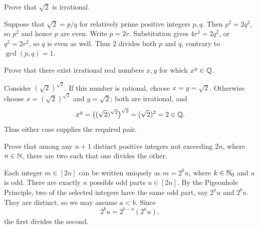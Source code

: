 \documentclass[11pt, oneside]{article}
\begin{document}


\begin{problem}
Prove that $\sqrt{2}$ is irrational.
\end{problem}
\begin{solution}
Suppose that $\sqrt{2}=p/q$ for relatively prime positive integers $p, q$.
Then $p^2=2q^2$, so $p^2$ and hence $p$ are even. Write $p=2r$.
Substitution gives $4r^2=2q^2$, or $q^2=2r^2$, so $q$ is even as well.
Thus $2$ divides both $p$ and $q$, contrary to $\gcd(p, q)=1$.
\end{solution}

\begin{problem}
Prove that there exist irrational real numbers $x, y$ for which $x^y\in\mathbb{Q}$.
\end{problem}
\begin{solution}
Consider $(\sqrt{2})^{\sqrt{2}}$. If this number is rational, choose
$x=y=\sqrt{2}$. Otherwise choose
$x=(\sqrt{2})^{\sqrt{2}}$ and $y=\sqrt{2}$; both are irrational, and
\[
x^y=\bigl((\sqrt{2})^{\sqrt{2}}\bigr)^{\sqrt{2}}
=(\sqrt{2})^2=2\in\mathbb{Q}.
\]
Thus either case supplies the required pair.
\end{solution}

\begin{problem}
Prove that among any $n+1$ distinct positive integers not exceeding $2n$, where
$n\in\mathbb{N}$, there are two such that one divides the other.
\end{problem}
\begin{solution}
Each integer $m\in[2n]$ can be written uniquely as $m=2^ku$, where
$k\in\mathbb{N}_0$ and $u$ is odd. There are exactly $n$ possible odd parts
$u\in[2n]$. By the Pigeonhole Principle, two of the selected integers
have the same odd part, say $2^au$ and $2^bu$. They are distinct, so
we may assume $a<b$. Since
\[
2^bu=2^{b-a}(2^au),
\]
the first divides the second.
\end{solution}
\end{document}
